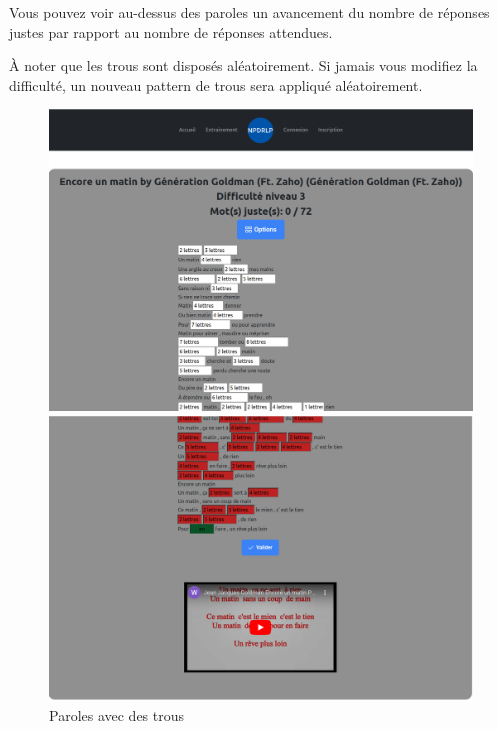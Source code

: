 \documentclass[12pt,french]{article}
\begin{document}
Vous pouvez voir au-dessus des paroles un avancement du nombre de réponses justes par rapport au nombre de réponses attendues.

À noter que les trous sont disposés aléatoirement. Si jamais vous modifiez la difficulté, un nouveau pattern de trous sera appliqué aléatoirement.

\begin{figure}[H]
	\centering
	\begin{minipage}{.5\textwidth}
		\centering
		\includegraphics[scale=0.15]{diffi1.png}
	\end{minipage}%
	\begin{minipage}{.5\textwidth}
		\centering
		\includegraphics[scale=0.15]{diffi2.png}
	\end{minipage}
	\caption{Paroles avec des trous}
\end{figure}
\end{document}
